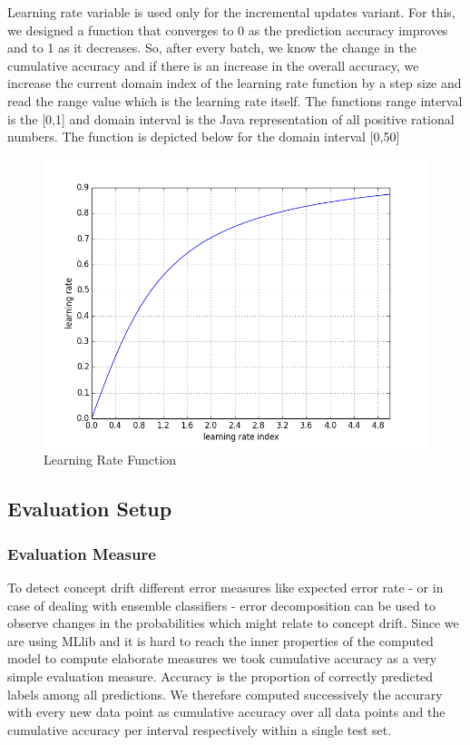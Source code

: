 \documentclass{article} %
\begin{document}
Learning rate variable is used only for the incremental updates variant. For this, we designed a function that converges to 0 as the prediction accuracy improves and to 1 as it decreases. So, after every batch, we know the change in the cumulative accuracy and if there is an increase in the overall accuracy, we increase the current domain index of the learning rate function by a step size and read the range value which is the learning rate itself. The functions range interval is the [0,1] and domain interval is the Java representation of all positive rational numbers. The function is depicted below for the domain interval [0,50]

\begin{figure}[htbp]
  \centering
  \includegraphics[scale=0.54]{./figures/learning_rate_function.png}
  \caption{Learning Rate Function}
\end{figure}

\subsection{Evaluation Setup}


\subsubsection*{Evaluation Measure}

To detect concept drift different error measures like expected error rate - or in case of dealing with ensemble classifiers - error decomposition can be used to observe changes in the probabilities which might relate to concept drift.\cite{Gao07ageneral}  Since we are using MLlib and it is hard to reach the inner properties of the computed model to compute elaborate measures we took cumulative accuracy as a very simple evaluation measure.  Accuracy is the  proportion of correctly predicted labels among all predictions. We therefore computed  successively the accurary with every new data point as cumulative accuracy over all data points and the cumulative accuracy per interval respectively within a single test set.
\end{document}
